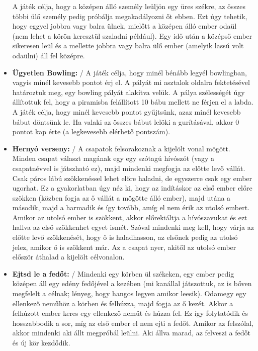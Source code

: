 \documentclass[a4paper, 12pt, twoside, openright]{article}
\begin{document}
\begin{itemize}
A játék célja, hogy a középen álló személy leüljön egy üres székre, az összes többi ülő személy pedig próbálja megakadályozni őt ebben. Ezt úgy tehetik, hogy eggyel jobbra vagy balra ülnek, mielőtt a középen álló ember odaül (nem lehet a körön keresztül szaladni például). Egy idő után a középső ember sikeresen leül és a mellette jobbra vagy balra ülő ember (amelyik lassú volt odaülni) áll fel középre.
\item \textbf{Ügyetlen Bowling:} / A játék célja, hogy minél bénább legyél bowlingban, vagyis minél kevesebb pontot érj el. A pályát mi asztalok oldalra fektetésével határoztuk meg, egy bowling pályát alakítva velük. A pálya szélességét úgy állítottuk fel, hogy a piramisba felállított 10 bábu mellett ne férjen el a labda. A játék célja, hogy minél kevesebb pontot gyűjtsünk, azaz minél kevesebb bábut döntsünk le. Ha valaki az összes bábut lelöki a gurításával, akkor 0 pontot kap érte (a legkevesebb elérhető pontszám).

\item \textbf{Hernyó verseny:} / A csapatok felsorakoznak a kijelölt vonal mögött. Minden csapat választ magának egy egy szótagú hívószót (vagy a csapatnévvel is játszható ez), majd mindenki megfogja az előtte levő vállát. Csak páros lábú szökkenéssel lehet előre haladni, de egyszerre csak egy ember ugorhat. Ez a gyakorlatban úgy néz ki, hogy az indításkor az első ember előre szökken (közben fogja az ő vállát a mögötte álló ember), majd utána a második, majd a harmadik és így tovább, amíg el nem érik az utolsó embert. Amikor az utolsó ember is szökkent, akkor előrekiáltja a hívószavukat és ezt hallva az első szökkenhet egyet ismét. Szóval mindenki meg kell, hogy várja az előtte levő szökkenését, hogy ő is haladhasson, az elsőnek pedig az utolsó jelez, amikor ő is szökkent már. Az a csapat nyer, akitől az utolsó ember először áthalad a kijelölt célvonalon.

\item \textbf{Ejtsd le a fedőt:} / Mindenki egy körben ül székeken, egy ember pedig középen áll egy edény fedőjével a kezében (mi kanállal játszottuk, az is bőven megfelelt a célnak; lényeg, hogy hangos legyen amikor leesik). Odamegy egy ellenkező neműhöz a körben és felhúzza, majd fogja az ő kezét. Akkor a felhúzott ember keres egy ellenkező neműt és húzza fel. Ez így folytatódik és hosszabbodik a sor, míg az első ember el nem ejti a fedőt. Amikor az felszólal, akkor mindenki aki állt megpróbál leülni. Aki állva marad, az felveszi a fedőt és új kör kezdődik.


\end{itemize}
\end{document}
